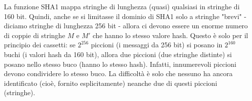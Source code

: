 \documentclass{article}
\theoremstyle{definition}
\begin{document}
La funzione SHA1 mappa stringhe di lunghezza (quasi) qualsiasi in stringhe di 160 bit. Quindi, anche se si limitasse il dominio di SHA1 solo a stringhe "brevi" - diciamo stringhe di lunghezza 256 bit - allora ci devono essere un enorme numero di coppie di stringhe \( M \) e \( M' \) che hanno lo stesso valore hash. Questo è solo per il principio dei cassetti: se \( 2^{256} \) piccioni (i messaggi da 256 bit) si posano in \( 2^{160} \) buchi (i valori hash da 160 bit), allora due piccioni (due stringhe distinte) si posano nello stesso buco (hanno lo stesso hash). Infatti, innumerevoli piccioni devono condividere lo stesso buco. La difficoltà è solo che nessuno ha ancora identificato (cioè, fornito esplicitamente) neanche due di questi piccioni (stringhe).




\end{document}

